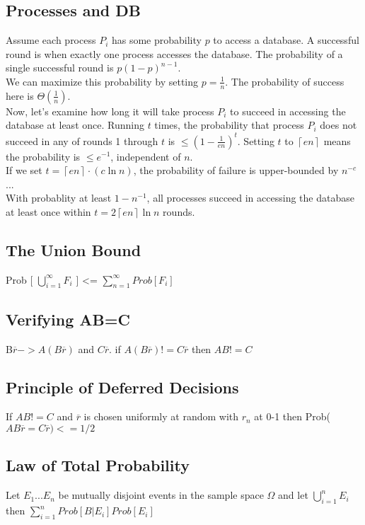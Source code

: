 \subsection{Processes and DB}
Assume each process $P_i$ has some probability $p$ to access a database. A successful round is when exactly one process accesses the database. The probability of a single successful round is $p(1 - p)^{n-1}$.\\
We can maximize this probability by setting $p = \frac{1}{n}$. The probability of success here is $\Theta(\frac{1}{n})$.\\
Now, let's examine how long it will take process $P_i$ to succeed in accessing the database at least once. Running $t$ times, the probability that process $P_i$ does not succeed in any of rounds 1 through $t$ is $\leq (1 - \frac{1}{en})^t$. Setting $t$ to $\left\lceil en \right\rceil$ means the probability is $\leq e^{-1}$, independent of $n$.\\
If we set $t = \left\lceil en \right\rceil \cdot (c \ln n)$, the probability of failure is upper-bounded by $n^{-c}$ ...\\
With probablity at least $1 - n^{-1}$, all processes succeed in accessing the database at least once within $t = 2 \left\lceil en \right\rceil \ln n$ rounds.

\subsection{The Union Bound}
Prob [ $\bigcup\limits_{i=1}^{\infty} F_{i}$ ] <= $\sum_{n=1}^{\infty}  Prob[ F_{i}] $ 


\subsection{Verifying AB=C}

B$\overbar{r} -> A(B\overbar{r})$ and $C\overbar{r}$. if $A(B\overbar{r}) != C\overbar{r}$ then $AB != C$

\subsection{Principle of Deferred Decisions}
If $AB != C$ and $\overbar{r}$ is chosen uniformly at random with $r_n$ at 0-1 then Prob($AB\overbar{r} = C\overbar{r}) <= 1/2$

\subsection{Law of Total Probability}
Let $E_1 ... E_n$ be mutually disjoint events in the sample space $\Omega$ and let $\bigcup\limits_{i=1}^{n} E_{i}$ then $\sum_{i=1}^{n}  Prob[ B | E_{i}] Prob[E_{i}] $ 

